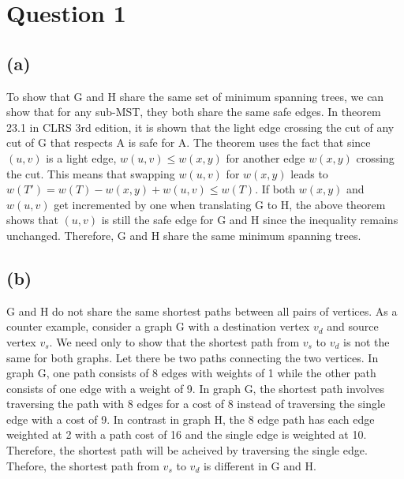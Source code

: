 \section{Question 1}
	\subsection{(a)}
	To show that G and H share the same set of minimum spanning trees, we can show that for any sub-MST, they both share the same safe edges.
	In theorem 23.1 in CLRS 3rd edition, it is shown that the light edge crossing the cut of any cut of G that respects A is safe for A.
	The theorem uses the fact that since $(u,v)$ is a light edge, $w(u,v) \leq w(x,y)$ for another edge $w(x,y)$ crossing the cut. 
	This means that swapping $w(u,v)$ for $w(x,y)$ leads to $w(T') = w(T) - w(x,y) + w(u,v) \leq w(T)$.
	If both $w(x,y)$ and $w(u,v)$ get incremented by one when translating G to H, the above theorem shows that $(u, v)$ is still the safe edge for G and H
	since the inequality remains unchanged. Therefore, G and H share the same minimum spanning trees.

	\subsection{(b)}
		G and H do not share the same shortest paths between all pairs of vertices.
		\linebreak
		As a counter example, consider a graph G with a destination vertex $v_d$ and source vertex $v_s$.
		We need only to show that the shortest path from $v_s$ to $v_d$ is not the same for both graphs.
		Let there be two paths connecting the two vertices. In graph G, one path consists of 8 edges with weights of 1
		while the other path consists of one edge with a weight of 9. In graph G, the shortest path involves traversing
		the path with 8 edges for a cost of 8 instead of traversing the single edge with a cost of 9. In contrast in graph H,
		the 8 edge path has each edge weighted at 2 with a path cost of 16 and the single edge is weighted at 10. Therefore,
		the shortest path will be acheived by traversing the single edge. Thefore, the shortest path from $v_s$ to $v_d$ is
		different in G and H.